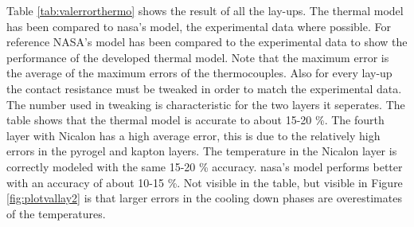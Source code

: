 Table \ref{tab:valerrorthermo} shows the result of all the lay-ups. The thermal model has been compared to \gls{nasa}'s model, the experimental data where possible. For reference NASA's model has been compared to the experimental data to show the performance of the developed thermal model. Note that the maximum error is the average of the maximum errors of the thermocouples. Also for every lay-up the contact resistance must be tweaked in order to match the experimental data. The number used in tweaking is characteristic for the two layers it seperates. The table shows that the thermal model is accurate to about 15-20 \%. The fourth layer with Nicalon has a high average error, this is due to the relatively high errors in the pyrogel and kapton layers. The temperature in the Nicalon layer is correctly modeled with the same 15-20 \% accuracy. \gls{nasa}'s model performs better with an accuracy of about 10-15 \%. Not visible in the table, but visible in Figure \ref{fig:plotvallay2} is that larger errors in the cooling down phases are overestimates of the temperatures.

